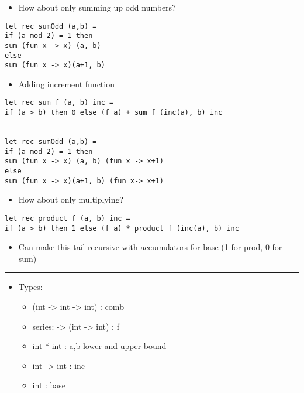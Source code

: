 \documentclass[11pt]{article}
\begin{document}
\begin{itemize}
\item How about only summing up odd numbers?
\end{itemize}

\begin{verbatim}
let rec sumOdd (a,b) =
if (a mod 2) = 1 then 
sum (fun x -> x) (a, b)
else 
sum (fun x -> x)(a+1, b)
\end{verbatim}


\begin{itemize}
\item Adding increment function
\end{itemize}
\begin{verbatim}
let rec sum f (a, b) inc =
if (a > b) then 0 else (f a) + sum f (inc(a), b) inc


let rec sumOdd (a,b) =
if (a mod 2) = 1 then 
sum (fun x -> x) (a, b) (fun x -> x+1)
else 
sum (fun x -> x)(a+1, b) (fun x-> x+1)
\end{verbatim}

\begin{itemize}
\item How about only multiplying?
\end{itemize}

\begin{verbatim}
let rec product f (a, b) inc =
if (a > b) then 1 else (f a) * product f (inc(a), b) inc
\end{verbatim}

\begin{itemize}
\item Can make this tail recursive with accumulators for base (1 for prod, 0 for sum)
\end{itemize}

\noindent\rule{\textwidth}{0.5pt}
\begin{itemize}
\item Types: 
\begin{itemize}
\item (int -> int -> int) : comb

\item series: -> (int -> int) : f

\item int * int : a,b lower and upper bound

\item int -> int : inc

\item int : base
\end{itemize}
\end{itemize}
\end{document}
